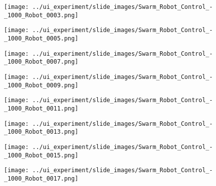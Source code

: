 \begin{minipage}{\linewidth}
	\centering
	\begin{minipage}{0.42\linewidth}
		\texttt{[image: ../ui\_experiment/slide\_images/Swarm\_Robot\_Control\_-\_1000\_Robot\_0003.png]}
		\label{fig:sub1}
	\end{minipage}
	\hspace{0.05\linewidth}
	\begin{minipage}{0.42\linewidth}
		\texttt{[image: ../ui\_experiment/slide\_images/Swarm\_Robot\_Control\_-\_1000\_Robot\_0005.png]}
		\label{fig:sub2}
	\end{minipage}
\end{minipage}

\begin{minipage}{\linewidth}
	\centering
	\begin{minipage}{0.42\linewidth}
		\texttt{[image: ../ui\_experiment/slide\_images/Swarm\_Robot\_Control\_-\_1000\_Robot\_0007.png]}
		\label{fig:sub1}
	\end{minipage}
	\hspace{0.05\linewidth}
	\begin{minipage}{0.42\linewidth}
		\texttt{[image: ../ui\_experiment/slide\_images/Swarm\_Robot\_Control\_-\_1000\_Robot\_0009.png]}
		\label{fig:sub2}
	\end{minipage}
\end{minipage}

\begin{minipage}{\linewidth}
	\centering
	\begin{minipage}{0.42\linewidth}
		\texttt{[image: ../ui\_experiment/slide\_images/Swarm\_Robot\_Control\_-\_1000\_Robot\_0011.png]}
		\label{fig:sub1}
	\end{minipage}
	\hspace{0.05\linewidth}
	\begin{minipage}{0.42\linewidth}
		\texttt{[image: ../ui\_experiment/slide\_images/Swarm\_Robot\_Control\_-\_1000\_Robot\_0013.png]}
		\label{fig:sub2}
	\end{minipage}
\end{minipage}

\begin{minipage}{\linewidth}
	\centering
	\begin{minipage}{0.42\linewidth}
		\centering
		\texttt{[image: ../ui\_experiment/slide\_images/Swarm\_Robot\_Control\_-\_1000\_Robot\_0015.png]}
		\label{fig:sub1}
	\end{minipage}
	\hspace{0.05\linewidth}
	\begin{minipage}{0.42\linewidth}
		\texttt{[image: ../ui\_experiment/slide\_images/Swarm\_Robot\_Control\_-\_1000\_Robot\_0017.png]}
		\label{fig:sub2}
	\end{minipage}
\end{minipage}

